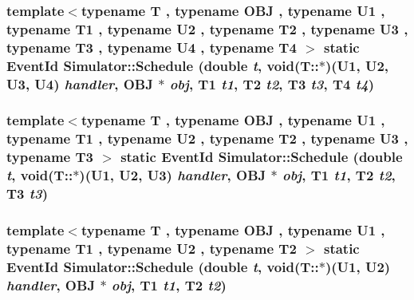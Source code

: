 \hypertarget{classSimulator_6846b3f0aa16ad7b4a4a1653837c123a}{
\subsubsection[{Schedule}]{\setlength{\rightskip}{0pt plus 5cm}template$<$typename T , typename OBJ , typename U1 , typename T1 , typename U2 , typename T2 , typename U3 , typename T3 , typename U4 , typename T4 $>$ static {\bf EventId} Simulator::Schedule (double {\em t}, \/  void(T::$\ast$)(U1, U2, U3, U4) {\em handler}, \/  OBJ $\ast$ {\em obj}, \/  T1 {\em t1}, \/  T2 {\em t2}, \/  T3 {\em t3}, \/  T4 {\em t4})}}
\label{classSimulator_6846b3f0aa16ad7b4a4a1653837c123a}


\hypertarget{classSimulator_f4102ccb431eea8143497cb92fb499d4}{
\subsubsection[{Schedule}]{\setlength{\rightskip}{0pt plus 5cm}template$<$typename T , typename OBJ , typename U1 , typename T1 , typename U2 , typename T2 , typename U3 , typename T3 $>$ static {\bf EventId} Simulator::Schedule (double {\em t}, \/  void(T::$\ast$)(U1, U2, U3) {\em handler}, \/  OBJ $\ast$ {\em obj}, \/  T1 {\em t1}, \/  T2 {\em t2}, \/  T3 {\em t3})}}
\label{classSimulator_f4102ccb431eea8143497cb92fb499d4}


\hypertarget{classSimulator_bb9b661fcd4fcbb62c331ef07a53eb7d}{
\subsubsection[{Schedule}]{\setlength{\rightskip}{0pt plus 5cm}template$<$typename T , typename OBJ , typename U1 , typename T1 , typename U2 , typename T2 $>$ static {\bf EventId} Simulator::Schedule (double {\em t}, \/  void(T::$\ast$)(U1, U2) {\em handler}, \/  OBJ $\ast$ {\em obj}, \/  T1 {\em t1}, \/  T2 {\em t2})}}
\label{classSimulator_bb9b661fcd4fcbb62c331ef07a53eb7d}


